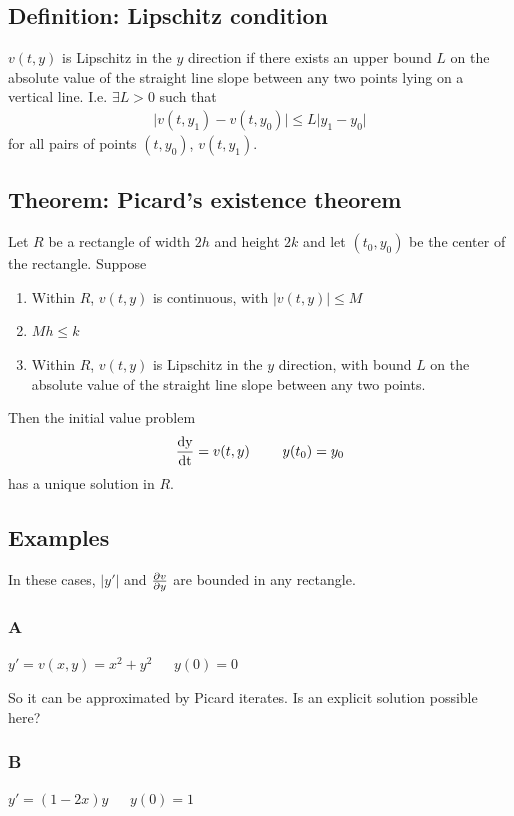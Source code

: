 \subsection{Definition: Lipschitz condition}
$v(t, y)$ is Lipschitz in the $y$ direction if there exists an upper bound $L$
on the absolute value of the straight line slope between any two points lying
on a vertical line. I.e. $\exists L > 0$ such that
\begin{align*}
  \Big|v(t, y_1) - v(t, y_0)\Big| \leq L\Big|y_1 - y_0\Big|
\end{align*}
for all pairs of points $(t, y_0)$, $v(t, y_1)$.

\subsection{Theorem: Picard's existence theorem}
\begin{mdframed}
Let $R$ be a rectangle of width $2h$ and height $2k$ and let
$(t_0, y_0)$ be the center of the rectangle. Suppose
\begin{enumerate}
\item Within $R$, $v(t, y)$ is continuous, with $|v(t, y)| \leq M$
\item $Mh \leq k$
\item Within $R$, $v(t, y)$ is Lipschitz in the $y$ direction, with bound $L$
  on the absolute value of the straight line slope between any two points.
\end{enumerate}

Then the initial value problem
\begin{align*}
  \frac{\operatorname{\text{dy}}}{\operatorname{\text{dt}}} = v(t, y) ~~~~~~~ y(t_0) = y_0
\end{align*}
has a unique solution in $R$.
\end{mdframed}

\subsection{Examples}

In these cases, $|y'|$ and $\frac{\partial v}{\partial y}$ are bounded in any rectangle.

\subsubsection{A}
$y' = v(x, y) = x^2 + y^2 ~~~~~~~ y(0) = 0$

So it can be approximated by Picard iterates. Is an explicit solution possible here?

\subsubsection{B}
$y' = (1 - 2x)y ~~~~~~~ y(0) = 1$

